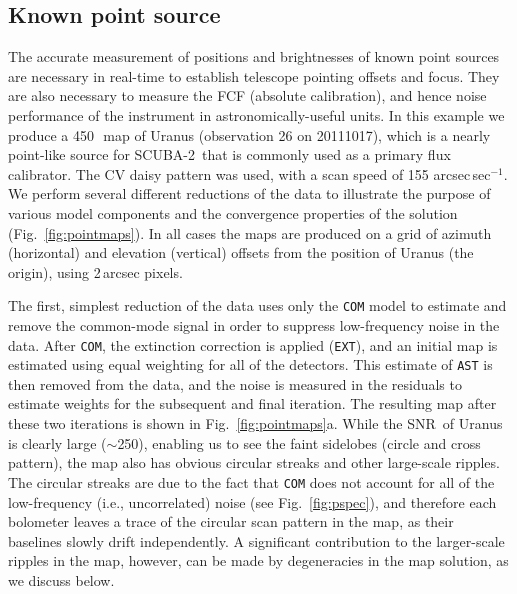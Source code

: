 \documentclass[useAMS,usenatbib,nofootinbib]{mn2e}
\newcommand{\snr}{SNR}
\newcommand{\scuba}{SCUBA-2}
\newcommand{\model}[1]{\texttt{#1}}
\begin{document}
\subsection{Known point source}
\label{sec:point}

The accurate measurement of positions and brightnesses of known point
sources are necessary in real-time to establish telescope pointing
offsets and focus. They are also necessary to measure the FCF
(absolute calibration), and hence noise performance of the instrument
in astronomically-useful units.  In this example we produce a
450\,\micron\ map of Uranus (observation 26 on 20111017), which is a
nearly point-like source for \scuba\ that is commonly used as a
primary flux calibrator. The CV daisy pattern was used, with a scan
speed of 155 arcsec\,sec$^{-1}$. We perform several different
reductions of the data to illustrate the purpose of various model
components and the convergence properties of the solution
(Fig.~\ref{fig:pointmaps}). In all cases the maps are produced on a
grid of azimuth (horizontal) and elevation (vertical) offsets from the
position of Uranus (the origin), using 2\,arcsec pixels.

The first, simplest reduction of the data uses only the \model{COM}
model to estimate and remove the common-mode signal in order to
suppress low-frequency noise in the data. After \model{COM}, the
extinction correction is applied (\model{EXT}), and an initial map is
estimated using equal weighting for all of the detectors. This
estimate of \model{AST} is then removed from the data, and the noise
is measured in the residuals to estimate weights for the subsequent
and final iteration. The resulting map after these two iterations is
shown in Fig.~\ref{fig:pointmaps}a. While the \snr\ of Uranus is
clearly large ($\sim$250), enabling us to see the faint sidelobes
(circle and cross pattern), the map also has obvious circular streaks
and other large-scale ripples. The circular streaks are due to the
fact that \model{COM} does not account for all of the low-frequency
(i.e., uncorrelated) noise (see Fig.~\ref{fig:pspec}), and therefore
each bolometer leaves a trace of the circular scan pattern in the map,
as their baselines slowly drift independently. A significant
contribution to the larger-scale ripples in the map, however, can be
made by degeneracies in the map solution, as we discuss below.
\end{document}
